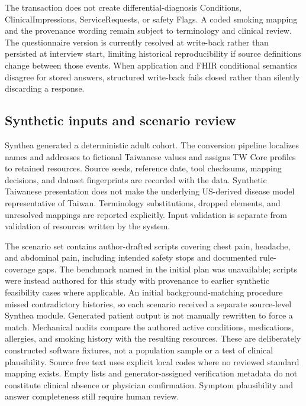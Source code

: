 The transaction does not create differential-diagnosis Conditions,
ClinicalImpressions, ServiceRequests, or safety Flags. A coded smoking mapping
and the provenance wording remain subject to terminology and clinical review.
The questionnaire version is currently resolved at write-back rather than
persisted at interview start, limiting historical reproducibility if source
definitions change between those events. When application and FHIR conditional
semantics disagree for stored answers, structured write-back fails closed rather
than silently discarding a response.

\subsection{Synthetic inputs and scenario review}
Synthea generated a deterministic adult cohort.\cite{syntheaSoftware}
The conversion pipeline localizes names and addresses to fictional Taiwanese
values and assigns TW Core profiles to retained resources. Source seeds,
reference date, tool checksums, mapping decisions, and dataset fingerprints are
recorded with the data. Synthetic Taiwanese presentation does not make the
underlying US-derived disease model representative of Taiwan. Terminology
substitutions, dropped elements, and unresolved mappings are reported explicitly.
Input validation is separate from validation of resources written by the system.

The scenario set contains \ScenarioCount{} author-drafted scripts covering chest
pain, headache, and abdominal pain, including intended safety stops and documented
rule-coverage gaps. The benchmark named in the initial plan was unavailable;
scripts were instead authored for this study with provenance to earlier synthetic
feasibility cases where applicable. An initial background-matching procedure
missed contradictory histories, so each scenario received a separate source-level
Synthea module. Generated patient output is not manually rewritten to force a
match. Mechanical audits compare the authored active conditions, medications,
allergies, and smoking history with the resulting resources. These are deliberately
constructed software fixtures, not a population sample or a test of clinical
plausibility. Source free text uses explicit local codes where no reviewed standard
mapping exists. Empty lists and generator-assigned verification metadata do not
constitute clinical absence or physician confirmation. Symptom plausibility and
answer completeness still require human review.

